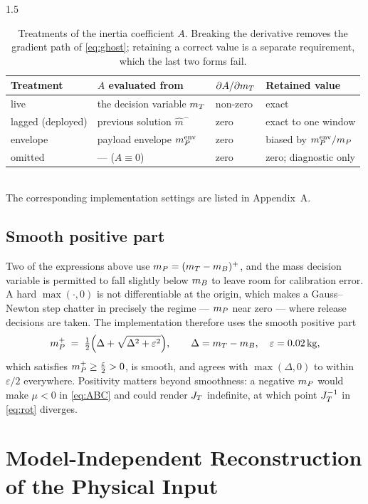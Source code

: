 \begin{spacing}{1.5}
\begin{table}[ht]
\centering
\caption{Treatments of the inertia coefficient $A$. Breaking the derivative
removes the gradient path of \eqref{eq:ghost}; retaining a correct value is a
separate requirement, which the last two forms fail.}
\label{tab:amode}
\small
\begin{tabular}{@{}llll@{}}
\toprule
Treatment & $A$ evaluated from & $\partial A/\partial m_T$ & Retained value \\
\midrule
live & the decision variable $m_T$ & non-zero & exact \\
lagged (deployed) & previous solution $\hat m^{-}$ & zero & exact to one window \\
envelope & payload envelope $m_P^{\mathrm{env}}$ & zero & biased by $m_P^{\mathrm{env}}/m_P$ \\
omitted & --- ($A\equiv0$) & zero & zero; diagnostic only \\
\bottomrule
\end{tabular}
\\[4pt]
\footnotesize The corresponding implementation settings are listed in Appendix~A.
\end{table}

\subsection{Smooth positive part}\label{sec:model:smoothpos}

Two of the expressions above use $m_P=(m_T-m_B)^{+}$, and the mass decision
variable is permitted to fall slightly below $m_B$ to leave room for calibration
error. A hard $\max(\cdot,0)$ is not differentiable at the origin, which makes a
Gauss--Newton step chatter in precisely the regime --- $m_P$ near zero --- where
release decisions are taken. The implementation therefore uses the smooth
positive part
\begin{equation}
\mP^{+} \;=\; \tfrac{1}{2}\Bigl(\Delta + \sqrt{\Delta^2+\varepsilon^2}\Bigr),
\qquad \Delta = \mT-\mB, \quad \varepsilon=\SI{0.02}{\kg},
\label{eq:smoothpos}
\end{equation}
which satisfies $m_P^{+}\ge \tfrac{\varepsilon}{2}>0$, is smooth, and agrees with
$\max(\Delta,0)$ to within $\varepsilon/2$ everywhere. Positivity matters beyond
smoothness: a negative $m_P$ would make $\mu<0$ in \eqref{eq:ABC} and could
render $J_T$ indefinite, at which point $J_T^{-1}$ in \eqref{eq:rot} diverges.

\section{Model-Independent Reconstruction of the Physical Input}\label{sec:model:phys}


\end{spacing}
